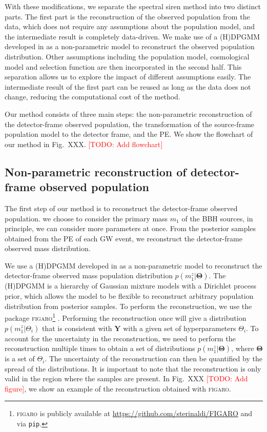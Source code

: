\documentclass[aps,prd,twocolumn,superscriptaddress,preprintnumbers,nofootinbib,hidelinks]{revtex4-2}
\newcommand{\todo}[1]{\textcolor{red}{[TODO: #1]}}
\begin{document}
With these modifications, we separate the spectral siren method into two distinct parts.
The first part is the reconstruction of the observed population from the data, which does not require any assumptions about the population model, and the intermediate result is completely data-driven.
We make use of a \ac{(H)DPGMM} developed in \citet{Rinaldi:2021bhm} as a non-parametric model to reconstruct the observed population distribution.
Other assumptions including the population model, cosmological model and selection function are then incorporated in the second half.
This separation allows us to explore the impact of different assumptions easily.
The intermediate result of the first part can be reused as long as the data does not change, reducing the computational cost of the method.

Our method consists of three main steps: the non-parametric reconstruction of the detector-frame observed population, the transformation of the source-frame population model to the detector frame, and the \ac{PE}.
We show the flowchart of our method in Fig.~XXX. \todo{Add flowchart}

\subsection{Non-parametric reconstruction of detector-frame observed population}
\label{sec:reconstruction}

The first step of our method is to reconstruct the detector-frame observed population.
we choose to consider the primary mass $m_1$ of the \ac{BBH} sources, in principle, we can consider more parameters at once.
From the posterior samples obtained from the \ac{PE} of each \ac{GW} event, we reconstruct the detector-frame observed mass distribution.

We use a \ac{(H)DPGMM} developed in \citet{Rinaldi:2021bhm} as a non-parametric model to reconstruct the detector-frame observed mass population distribution $p(m^z_1|\mathbf{\Theta})$.
The \ac{(H)DPGMM} is a hierarchy of Gaussian mixture models with a Dirichlet process prior, which allows the model to be flexible to reconstruct arbitrary population distribution from posterior samples.
To perform the reconstruction, we use the package \textsc{figaro}\footnote{\textsc{figaro} is publicly available at \url{https://github.com/sterinaldi/FIGARO} and via \texttt{pip}.} \citep{Rinaldi:2024eep}.
Performing the reconstruction once will give a distribution $p(m^z_1|\Theta_i)$ that is consistent with $\mathbf{Y}$ with a given set of hyperparameters $\Theta_i$.
To account for the uncertainty in the reconstruction, we need to perform the reconstruction multiple times to obtain a set of distributions $p(m^z_1|\mathbf{\Theta})$, where $\mathbf{\Theta}$ is a set of $\Theta_i$.
The uncertainty of the reconstruction can then be quantified by the spread of the distributions.
It is important to note that the reconstruction is only valid in the region where the samples are present.
In Fig.~XXX \todo{Add figure}, we show an example of the reconstruction obtained with \textsc{figaro}.
\end{document}
